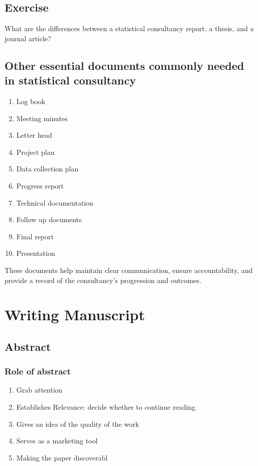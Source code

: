 \documentclass[
  letterpaper,
  DIV=11,
  numbers=noendperiod]{scrreprt}
\begin{document}
\section{Exercise}\label{exercise-3}

What are the differences between a statistical consultancy report, a
thesis, and a journal article?

\section{Other essential documents commonly needed in statistical
consultancy}\label{other-essential-documents-commonly-needed-in-statistical-consultancy}

\begin{enumerate}
\def\labelenumi{\arabic{enumi}.}
\item
  Log book
\item
  Meeting minutes
\item
  Letter head
\item
  Project plan
\item
  Data collection plan
\item
  Progress report
\item
  Technical documentation
\item
  Follow up documents
\item
  Final report
\item
  Presentation
\end{enumerate}

These documents help maintain clear communication, ensure
accountability, and provide a record of the consultancy's progression
and outcomes.


\chapter{Writing Manuscript}\label{writing-manuscript}

\section{Abstract}\label{abstract}

\subsection{Role of abstract}\label{role-of-abstract}

\begin{enumerate}
\def\labelenumi{\arabic{enumi}.}
\item
  Grab attention
\item
  Establishes Relevance: decide whether to continue reading
\item
  Gives an idea of the quality of the work
\item
  Serves as a marketing tool
\item
  Making the paper discoverabl
\end{enumerate}
\end{document}
